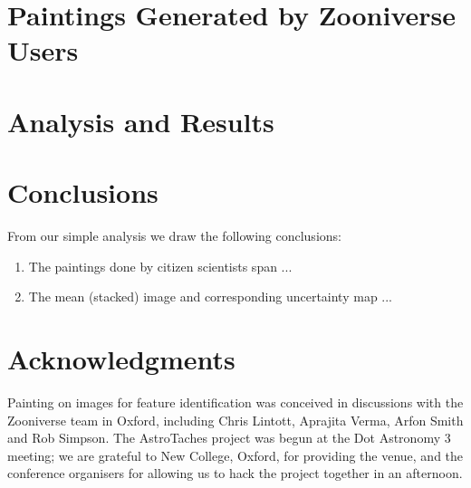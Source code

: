\documentclass[useAMS,usenatbib]{mn2e}
\begin{document}
\section{Paintings Generated by Zooniverse Users}
\label{sect:data}




\section{Analysis and Results}
\label{sect:results}




\section{Conclusions}
\label{sect:concl}

From our simple analysis we draw the following conclusions:

\begin{enumerate}

\item The paintings done by citizen scientists span ... 

\item The mean (stacked) image and corresponding uncertainty map ... 

\end{enumerate}


\section*{Acknowledgments} 

Painting on images for feature identification 
was conceived in discussions with the Zooniverse team in Oxford,
including Chris Lintott, Aprajita Verma, Arfon Smith and Rob Simpson. The
AstroTaches project was begun at the Dot Astronomy 3 meeting; we are grateful
to New College, Oxford, for providing the venue, and the conference organisers
for allowing us to hack the project together in an afternoon. 
%

\label{lastpage}

% 





\bsp
\end{document}
